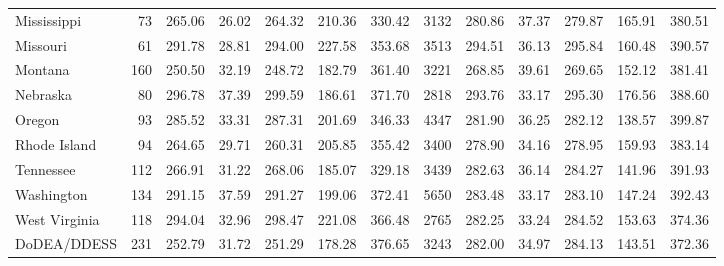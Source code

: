 \begin{sidewaystable}[ht]
{\begin{tabular}{lrrrrrr@{\extracolsep{10pt}}rrrrrr}
  Mississippi &  73 & 265.06 & 26.02 & 264.32 & 210.36 & 330.42 & 3132 & 280.86 & 37.37 & 279.87 & 165.91 & 380.51 \\ 
  Missouri &  61 & 291.78 & 28.81 & 294.00 & 227.58 & 353.68 & 3513 & 294.51 & 36.13 & 295.84 & 160.48 & 390.57 \\ 
  Montana & 160 & 250.50 & 32.19 & 248.72 & 182.79 & 361.40 & 3221 & 268.85 & 39.61 & 269.65 & 152.12 & 381.41 \\ 
  Nebraska &  80 & 296.78 & 37.39 & 299.59 & 186.61 & 371.70 & 2818 & 293.76 & 33.17 & 295.30 & 176.56 & 388.60 \\ 
  Oregon &  93 & 285.52 & 33.31 & 287.31 & 201.69 & 346.33 & 4347 & 281.90 & 36.25 & 282.12 & 138.57 & 399.87 \\ 
  Rhode Island &  94 & 264.65 & 29.71 & 260.31 & 205.85 & 355.42 & 3400 & 278.90 & 34.16 & 278.95 & 159.93 & 383.14 \\ 
  Tennessee & 112 & 266.91 & 31.22 & 268.06 & 185.07 & 329.18 & 3439 & 282.63 & 36.14 & 284.27 & 141.96 & 391.93 \\ 
  Washington & 134 & 291.15 & 37.59 & 291.27 & 199.06 & 372.41 & 5650 & 283.48 & 33.17 & 283.10 & 147.24 & 392.43 \\ 
  West Virginia & 118 & 294.04 & 32.96 & 298.47 & 221.08 & 366.48 & 2765 & 282.25 & 33.24 & 284.52 & 153.63 & 374.36 \\ 
  DoDEA/DDESS & 231 & 252.79 & 31.72 & 251.29 & 178.28 & 376.65 & 3243 & 282.00 & 34.97 & 284.13 & 143.51 & 372.36 \\ 
   \hline
\end{tabular}}
\end{sidewaystable}
